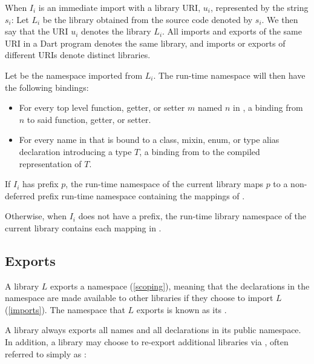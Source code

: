 \documentclass[makeidx]{article}
\begin{document}
\LMHash{}%
When $I_i$ is an immediate import with a library URI, $u_i$,
represented by the string $s_i$:
Let $L_i$ be the library obtained from the source code denoted by $s_i$.
We then say that the URI $u_i$ denotes the library $L_i$.
All imports and exports of the same URI in a Dart program denotes
the same library,
and imports or exports of different URIs denote distinct libraries.

\LMHash{}%
Let  be the namespace imported from $L_i$.
The run-time namespace  will then have the following bindings:

\begin{itemize}
\item
  For every top level function, getter, or setter $m$ named $n$ in
  ,
  a binding from $n$ to said function, getter, or setter.
\item
  For every name \id{} in 
  that is bound to a class, mixin, enum, or type alias declaration
  introducing a type $T$,
  a binding from \id{} to the compiled representation of $T$.
\end{itemize}

\LMHash{}%
If $I_i$ has prefix $p$,
the run-time namespace of the current library
maps $p$ to a non-deferred prefix run-time namespace 
containing the mappings of .


\LMHash{}%
Otherwise, when $I_i$ does not have a prefix,
the run-time library namespace of the current library
contains each mapping in .
\EndCase


\subsection{Exports}

\LMHash{}%
A library $L$ exports a namespace (\ref{scoping}), meaning that
the declarations in the namespace are made available to other libraries
if they choose to import $L$ (\ref{imports}).
The namespace that $L$ exports is known as its
.

\LMHash{}%
A library always exports all names and all declarations in its public namespace.
In addition, a library may choose to re-export additional libraries
via , often referred to simply as :
\end{document}
